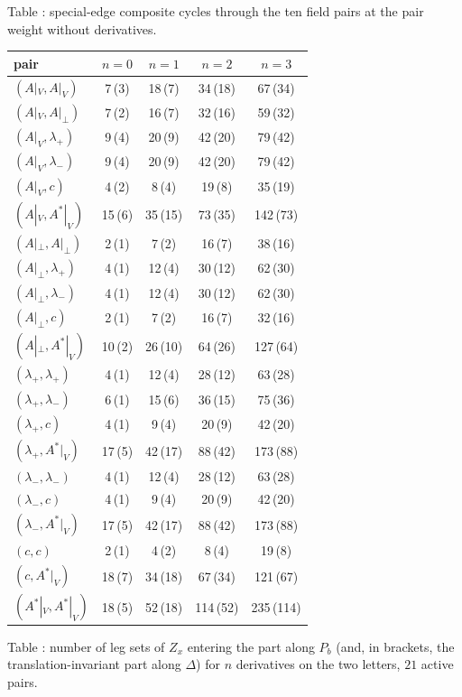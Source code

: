 \documentclass[11pt]{article}
\numberwithin{equation}{section}
\theoremstyle{plain}
\theoremstyle{definition}
\begin{document}
\begin{center}\small Table \theequation\label{tab:cc-fieldpairs}: special-edge composite cycles through the ten field pairs at the pair weight without derivatives.\end{center}

\begin{center}\small
\begin{tabular}{l|cccc}
pair & $n=0$ & $n=1$ & $n=2$ & $n=3$\\\hline
$(A|_V,A|_V)$ & 7\,(3) & 18\,(7) & 34\,(18) & 67\,(34)\\
$(A|_V,A|_\perp)$ & 7\,(2) & 16\,(7) & 32\,(16) & 59\,(32)\\
$(A|_V,\lambda_+)$ & 9\,(4) & 20\,(9) & 42\,(20) & 79\,(42)\\
$(A|_V,\lambda_-)$ & 9\,(4) & 20\,(9) & 42\,(20) & 79\,(42)\\
$(A|_V,c)$ & 4\,(2) & 8\,(4) & 19\,(8) & 35\,(19)\\
$(A|_V,A^*|_V)$ & 15\,(6) & 35\,(15) & 73\,(35) & 142\,(73)\\
$(A|_\perp,A|_\perp)$ & 2\,(1) & 7\,(2) & 16\,(7) & 38\,(16)\\
$(A|_\perp,\lambda_+)$ & 4\,(1) & 12\,(4) & 30\,(12) & 62\,(30)\\
$(A|_\perp,\lambda_-)$ & 4\,(1) & 12\,(4) & 30\,(12) & 62\,(30)\\
$(A|_\perp,c)$ & 2\,(1) & 7\,(2) & 16\,(7) & 32\,(16)\\
$(A|_\perp,A^*|_V)$ & 10\,(2) & 26\,(10) & 64\,(26) & 127\,(64)\\
$(\lambda_+,\lambda_+)$ & 4\,(1) & 12\,(4) & 28\,(12) & 63\,(28)\\
$(\lambda_+,\lambda_-)$ & 6\,(1) & 15\,(6) & 36\,(15) & 75\,(36)\\
$(\lambda_+,c)$ & 4\,(1) & 9\,(4) & 20\,(9) & 42\,(20)\\
$(\lambda_+,A^*|_V)$ & 17\,(5) & 42\,(17) & 88\,(42) & 173\,(88)\\
$(\lambda_-,\lambda_-)$ & 4\,(1) & 12\,(4) & 28\,(12) & 63\,(28)\\
$(\lambda_-,c)$ & 4\,(1) & 9\,(4) & 20\,(9) & 42\,(20)\\
$(\lambda_-,A^*|_V)$ & 17\,(5) & 42\,(17) & 88\,(42) & 173\,(88)\\
$(c,c)$ & 2\,(1) & 4\,(2) & 8\,(4) & 19\,(8)\\
$(c,A^*|_V)$ & 18\,(7) & 34\,(18) & 67\,(34) & 121\,(67)\\
$(A^*|_V,A^*|_V)$ & 18\,(5) & 52\,(18) & 114\,(52) & 235\,(114)\\
\end{tabular}
\end{center}
\begin{center}\small Table \theequation\label{tab:cc-counts}: number of leg sets of $Z_x$ entering the part along $P_b$ (and, in brackets, the translation-invariant part along $\Delta$) for $n$ derivatives on the two letters, $21$ active pairs.\end{center}
\end{document}
